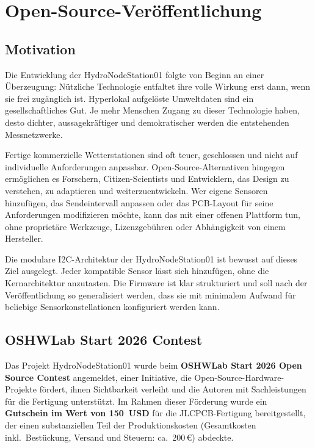 \chapter{Open-Source-Veröffentlichung}
\label{cha:opensource}

\section*{Motivation}

Die Entwicklung der HydroNodeStation01 folgte von Beginn an einer Überzeugung: Nützliche Technologie entfaltet ihre volle Wirkung erst dann, wenn sie frei zugänglich ist. Hyperlokal aufgelöste Umweltdaten sind ein gesellschaftliches Gut. Je mehr Menschen Zugang zu dieser Technologie haben, desto dichter, aussagekräftiger und demokratischer werden die entstehenden Messnetzwerke.

Fertige kommerzielle Wetterstationen sind oft teuer, geschlossen und nicht auf individuelle Anforderungen anpassbar. Open-Source-Alternativen hingegen ermöglichen es Forschern, Citizen-Scientists und Entwicklern, das Design zu verstehen, zu adaptieren und weiterzuentwickeln. Wer eigene Sensoren hinzufügen, das Sendeintervall anpassen oder das PCB-Layout für seine Anforderungen modifizieren möchte, kann das mit einer offenen Plattform tun, ohne proprietäre Werkzeuge, Lizenzgebühren oder Abhängigkeit von einem Hersteller.

Die modulare I2C-Architektur der HydroNodeStation01 ist bewusst auf dieses Ziel ausgelegt. Jeder kompatible Sensor lässt sich hinzufügen, ohne die Kernarchitektur anzutasten. Die Firmware ist klar strukturiert und soll nach der Veröffentlichung so generalisiert werden, dass sie mit minimalem Aufwand für beliebige Sensorkonstellationen konfiguriert werden kann.

\section*{OSHWLab Start 2026 Contest}

Das Projekt HydroNodeStation01 wurde beim \textbf{OSHWLab Start 2026 Open Source Contest} angemeldet, einer Initiative, die Open-Source-Hardware-Projekte fördert, ihnen Sichtbarkeit verleiht und die Autoren mit Sachleistungen für die Fertigung unterstützt. Im Rahmen dieser Förderung wurde ein \textbf{Gutschein im Wert von 150~USD} für die JLCPCB-Fertigung bereitgestellt, der einen substanziellen Teil der Produktionskosten (Gesamtkosten inkl.\ Bestückung, Versand und Steuern: ca.\ 200\,€) abdeckte.

